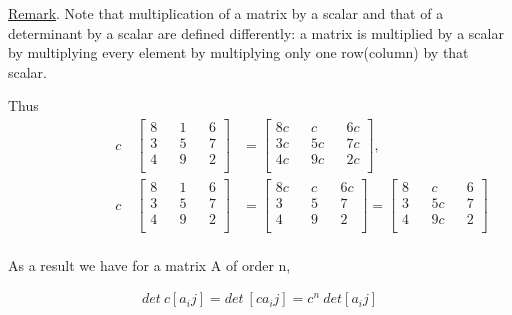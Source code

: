 \documentclass[11pt]{amsbook}
\begin{document}
\setlength{\parindent}{7ex}
\underline{Remark}. Note that multiplication of a matrix by a scalar 
and that of a determinant by a scalar are defined differently: a
matrix is multiplied by a scalar by multiplying every element by 
multiplying only one row(column) by that scalar.\par 
Thus
\begin{align*}
\qquad \qquad \qquad c  \quad       
	\begin{bmatrix}
		8  &&   1    &&  6\\
		3  &&   5    &&   7\\
		4  &&   9    &&  2\\
	\end{bmatrix} 
&= 
	\begin{bmatrix}
		8c  &&   c    &&  6c\\
		3c  &&   5c    &&   7c\\
		4c  &&   9c    &&  2c\\
	\end{bmatrix} ,
\\
\qquad \qquad \qquad c  \quad       
	\begin{bmatrix}
		8  &&   1    &&  6\\
		3  &&   5    &&   7\\
		4  &&   9    &&  2\\
	\end{bmatrix} 
&= 
	\begin{bmatrix}
		8c  &&   c    &&  6c\\
		3  &&   5    &&   7\\
		4  &&   9    &&  2\\
	\end{bmatrix}
= 
	\begin{bmatrix}
		8  &&   c    &&  6\\
		3  &&   5c    &&   7\\
		4  &&   9c    &&  2\\
	\end{bmatrix}
\end{align*}\\
As a result we have for a matrix A of order n,
   
  
\begin{align*}
 	det \ c[a_ij] = det \ [ca_ij] = c^n \ det[a_ij]
\end{align*}      
\end{document}
